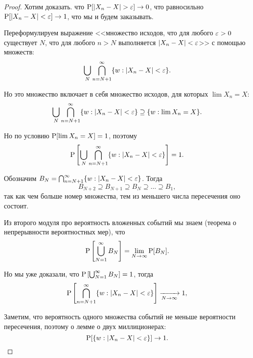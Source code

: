 \begin{proof}
    Хотим доказать. что $\P[|X_n - X| > \eps] \to 0 $, что равносильно $\P[|X_n - X| < \eps] \to 1$, что мы и будем заказывать.

    Переформулируем выражение <<множество исходов, что для любого $\eps > 0$ существует $N$, что для любого $n > N$ выполняется $|X_n - X| < \eps$>> с помощью множеств:
    \begin{equation*}
        \bigcup_N \bigcap_{n = N + 1}^{\infty} \{w: |X_n - X| < \eps\}.
    \end{equation*}

    Но это множество включает в себя множество исходов, для которых $\lim X_n = X$:
    \begin{equation*}
        \bigcup_N \bigcap_{n = N + 1}^{\infty} \{w: |X_n - X| < \eps\}
        \supseteq \{w: \lim X_n = X\}.
    \end{equation*}

    Но по условию $\P[\lim X_n = X] = 1$, поэтому
    \begin{equation*}
        \P\left[ \bigcup_N \bigcap_{n = N + 1}^{\infty} \{w: |X_n - X| < \eps\}\right] = 1.
    \end{equation*}

    Обозначим $B_N = \bigcap_{n = N + 1}^{\infty} \{w: |X_n - X| < \eps\}$. Тогда 
    \begin{equation*}
        B_{N + 2} \supseteq B_{N + 1} \supseteq B_{N} \supseteq \dots \supseteq B_1,
    \end{equation*}
    так как чем больше номер множества, тем из меньшего числа пересечения оно состоит.

    Из второго модуля про вероятность вложенных событий мы знаем (теорема о непрерывности вероятностных мер), что
    \begin{equation*}
        \P\left[\bigcup_{N = 1}^{\infty} B_N\right] = \lim_{N \to \infty} \P[B_N].
    \end{equation*}

    Но мы уже доказали, что $\P\left[\bigcup_{N = 1}^{\infty} B_N\right] = 1$, тогда
    \begin{equation*}
        \P\left[\bigcap_{n = N + 1}^{\infty} \{w: |X_n - X| < \eps\}\right] \xrightarrow[N \to \infty]{} 1,
    \end{equation*}

    Заметим, что вероятность одного множества событий не меньше вероятности пересечения, поэтому о лемме о двух миллиционерах:
    \begin{equation*}
        \P[\{w: |X_n - X| < \eps\}] \to 1.
    \end{equation*}
\end{proof}